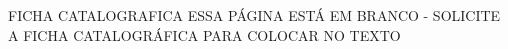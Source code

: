 FICHA CATALOGRAFICA
ESSA PÁGINA ESTÁ EM BRANCO - SOLICITE A FICHA CATALOGRÁFICA PARA COLOCAR NO TEXTO
\thispagestyle{empty}